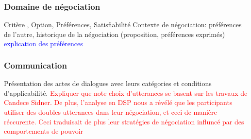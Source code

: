 \subsubsection{Domaine de négociation }
Critère , Option, Préférences, Satisfiabilité
Contexte de négociation: préférences de l'autre, historique de la négociation (proposition, préférences exprimés)
\textcolor{blue}{explication des préférences}
\subsubsection{Communication}
Présentation des actes de dialogues avec leurs catégories et conditions d'applicabilité. 
\textcolor{red}{Expliquer que note choix d'utterances se basent sur les travaux de Candece Sidner. De plus, l'analyse en DSP nous a révélé que les participants utiliser des doubles utterances dans leur négociation, et ceci de manière réccurente. Ceci traduisait de plus leur stratégies de négociation influncé par des comportements de pouvoir}


